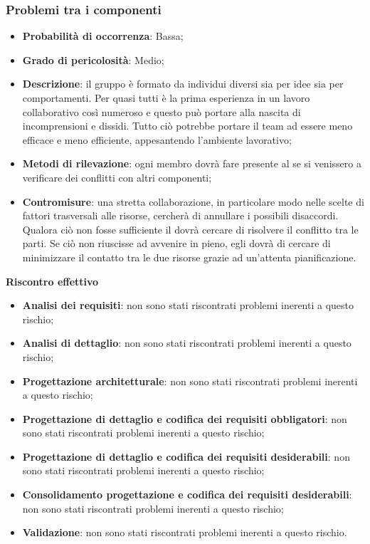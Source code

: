 		\subsubsection{Problemi tra i componenti} %
		\label{ssub:problemi_tra_i_componenti}
			\begin{itemize}
				\item \textbf{Probabilità di occorrenza}: Bassa;
				\item \textbf{Grado di pericolosità}: Medio;
				\item \textbf{Descrizione}: il gruppo è formato da individui diversi sia per idee sia per comportamenti. Per quasi tutti è la prima esperienza in un lavoro collaborativo così numeroso e questo può portare alla nascita di incomprensioni e dissidi. Tutto ciò potrebbe portare il team ad essere meno efficace e meno efficiente, appesantendo l'ambiente lavorativo;
				\item \textbf{Metodi di rilevazione}: ogni membro dovrà fare presente al \roleProjectManager{} se si venissero a verificare dei conflitti con altri componenti;
				\item \textbf{Contromisure}: una stretta collaborazione, in particolare modo nelle scelte di fattori trasversali alle risorse, cercherà di annullare i possibili disaccordi. \newline
				Qualora ciò non fosse sufficiente il \roleProjectManager{} dovrà cercare di risolvere il conflitto tra le parti. Se ciò non riuscisse ad avvenire in pieno, egli dovrà di cercare di minimizzare il contatto tra le due risorse grazie ad un'attenta pianificazione. \newline
			\end{itemize}
		\noindent
		\textbf{Riscontro effettivo}
			\begin{itemize}
				\item \textbf{Analisi dei requisiti}: non sono stati riscontrati problemi inerenti a questo rischio;
				\item \textbf{Analisi di dettaglio}: non sono stati riscontrati problemi inerenti a questo rischio;
				\item \textbf{Progettazione architetturale}: non sono stati riscontrati problemi inerenti a questo rischio;
				\item \textbf{Progettazione di dettaglio e codifica dei requisiti obbligatori}: non sono stati riscontrati problemi inerenti a questo rischio;
				\item \textbf{Progettazione di dettaglio e codifica dei requisiti desiderabili}: non sono stati riscontrati problemi inerenti a questo rischio;
				\item \textbf{Consolidamento progettazione e codifica dei requisiti desiderabili}: non sono stati riscontrati problemi inerenti a questo rischio;
				\item \textbf{Validazione}: non sono stati riscontrati problemi inerenti a questo rischio.
			\end{itemize}


